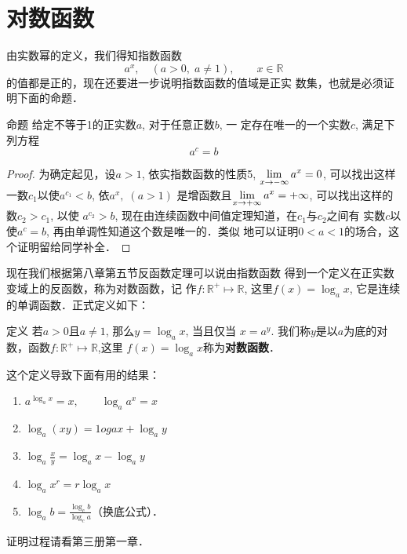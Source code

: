 \section{对数函数}

由实数幂的定义，我们得知指数函数
\[a^x,\quad (a>0,\;a\ne 1),\qquad x\in\mathbb{R}\]
的值都是正的，现在还要进一步说明指数函数的值域是正实
数集，也就是必须证明下面的命题．

\begin{blk}{命题}
   给定不等于1的正实数$a$, 对于任意正数$b$, 一
定存在唯一的一个实数$c$, 满足下列方程
$$a^c=b$$
\end{blk}

\begin{proof}
  为确定起见，设$a>1$, 依实指数函数的性质5,
$\displaystyle\lim_{x\to-\infty}a^x=0$, 可以找出这样一数$c_1$以使$a^{c_1}<b$, 依$a^x,\;(a>1)$
是增函数且$\displaystyle\lim_{x\to+\infty}a^x=+\infty$, 可以找出这样的数$c_2>c_1$, 以使
$a^{c_2}>b$, 现在由连续函数中间值定理知道，在$c_1$与$c_2$之间有
实数$c$以使$a^c=b$, 再由单调性知道这个数是唯一的．类似
地可以证明$0<a<1$的场合，这个证明留给同学补全．
\end{proof}


现在我们根据第八章第五节反函数定理可以说由指数函数
得到一个定义在正实数变域上的反函数，称为对数函数，记
作$f:\mathbb{R}^+\mapsto \mathbb{R}$, 这里$f(x)=\log_a x$, 它是连续的单调函数．正式定义如下：

\begin{blk}{定义}
   若$a>0$且$a\ne 1$, 那么$y=\log_a x$, 当且仅当
$x=a^y$. 我们称$y$是以$a$为底的对数，函数$f:\mathbb{R}^+\mapsto \mathbb{R}$,这里
$f(x)=\log_a x$称为\textbf{对数函数}．
\end{blk}

这个定义导致下面有用的结果：
\begin{enumerate}
  \item $a^{\log_a x}=x,\qquad \log_a a^x=x$
  \item $\log_a (xy)=1ogax+\log_a y$
  \item $\log_a \frac{x}{y}=\log_a x-\log_a y$
  \item $\log_a x^r=r\log_a x$
  \item $\log_a b=\frac{\log_c b}{\log_c a}$（换底公式）．
\end{enumerate}
证明过程请看第三册第一章．

